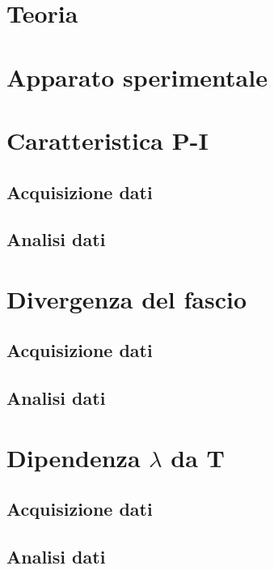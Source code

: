 \documentclass[a4paper]{article}
\begin{document}
\begin{multicols}{2}

\section{Teoria}

\section{Apparato sperimentale}

\section{Caratteristica P-I}

\subsection{Acquisizione dati}

\subsection{Analisi dati}

\section{Divergenza del fascio}

\subsection{Acquisizione dati}

\subsection{Analisi dati}

\section{Dipendenza $\lambda$ da T}

\subsection{Acquisizione dati}

\subsection{Analisi dati}

\end{multicols}
\end{document}
